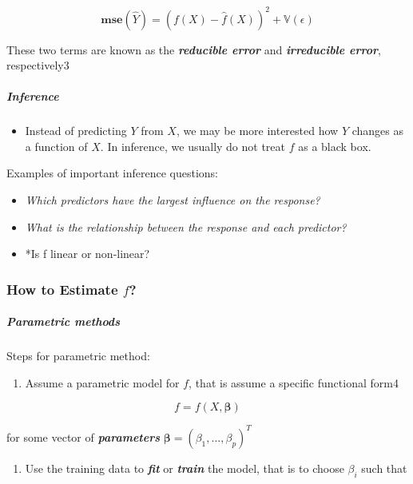 \documentclass[11pt]{article}
\providecommand{\tightlist}{%
      \setlength{\itemsep}{0pt}\setlength{\parskip}{0pt}}
\begin{document}
\[ \mathbf{mse}(\hat{Y}) = \left(f(X) - \hat{f}(X)\right)^2 + \mathbb{V}(\epsilon) \]

These two terms are known as the \textbf{\emph{reducible error}} and
\textbf{\emph{irreducible error}}, respectively3

    \hypertarget{inference}{%
\subparagraph{Inference}\label{inference}}

    \begin{itemize}
\tightlist
\item
  Instead of predicting \(Y\) from \(X\), we may be more interested how
  \(Y\) changes as a function of \(X\). In inference, we usually do not
  treat \(f\) as a black box.
\end{itemize}

Examples of important inference questions:

\begin{itemize}
\tightlist
\item
  \emph{Which predictors have the largest influence on the response?}
\item
  \emph{What is the relationship between the response and each
  predictor?}
\item
  *Is f linear or non-linear?
\end{itemize}

    \hypertarget{how-to-estimate-f}{%
\subsubsection{\texorpdfstring{How to Estimate
\(f\)?}{How to Estimate f?}}\label{how-to-estimate-f}}

    \hypertarget{parametric-methods}{%
\subparagraph{Parametric methods}\label{parametric-methods}}

    Steps for parametric method:

\begin{enumerate}
\def\labelenumi{\arabic{enumi}.}
\tightlist
\item
  Assume a parametric model for \(f\), that is assume a specific
  functional form4
\end{enumerate}

\[f = f(X, \boldsymbol{\beta}) \]

for some vector of \textbf{\emph{parameters}}
\(\boldsymbol{\beta} = (\beta_1,\dots,\beta_p)^T\)

\begin{enumerate}
\def\labelenumi{\arabic{enumi}.}
\setcounter{enumi}{1}
\tightlist
\item
  Use the training data to \textbf{\emph{fit}} or \textbf{\emph{train}}
  the model, that is to choose \(\beta_i\) such that
\end{enumerate}
\end{document}
